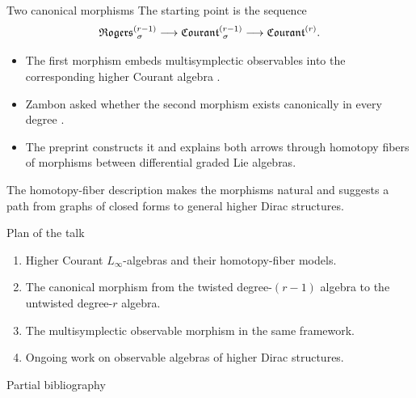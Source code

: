 \documentclass[beamer,10pt]{standalone}
\begin{document}
\begin{frame}{Two canonical morphisms}
  The starting point is the sequence
  \[
    \Rogers[\sigma]{r-1}
      \longrightarrow
    \Courant[\sigma]{r-1}
      \longrightarrow
    \Courant{r}.
  \]

  \vfill
  \begin{itemize}
    \item The first morphism embeds multisymplectic observables into the
      corresponding higher Courant algebra \cite{Miti2024}.
    \pause
    \item Zambon asked whether the second morphism exists canonically in every
      degree \cite{Zambon2012}.
    \pause
    \item The preprint \cite{Fiorenza2026} constructs it and explains both
      arrows through homotopy fibers of morphisms between differential graded
      Lie algebras.
  \end{itemize}

  \vfill\pause
  \begin{upshotblock}
    The homotopy-fiber description makes the morphisms natural and suggests a
    path from graphs of closed forms to general higher Dirac structures.
  \end{upshotblock}
\end{frame}

\begin{frame}{Plan of the talk}
  \begin{enumerate}
    \item Higher Courant $L_\infty$-algebras and their homotopy-fiber models.
    \vfill
    \item The canonical morphism from the twisted degree-$(r-1)$ algebra to
      the untwisted degree-$r$ algebra.
    \vfill
    \item The multisymplectic observable morphism in the same framework.
    \vfill
    \item Ongoing work on observable algebras of higher Dirac structures.
  \end{enumerate}
\end{frame}

\ifstandalone
\begin{frame}[t,allowframebreaks]{Partial bibliography}
  
  
\end{frame}
\fi
\end{document}
